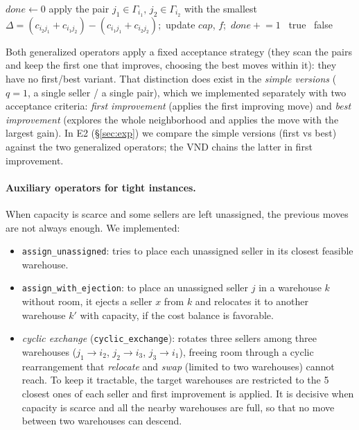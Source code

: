 \documentclass[11pt,a4paper]{article}
\newcommand{\code}[1]{\texttt{#1}}
\begin{document}
\begin{algorithm}[H]
\caption{\emph{Swap multiple} operator (first improvement)}
\begin{algorithmic}[1]
    \State $done \gets 0$
      \State apply the pair $j_1\in\Gamma_{i_1},\,j_2\in\Gamma_{i_2}$ with the smallest $\Delta=(c_{i_2 j_1}+c_{i_1 j_2})-(c_{i_1 j_1}+c_{i_2 j_2})$;\ update $cap$, $f$;\ $done \mathrel{+}= 1$
    \EndWhile
    \ \Return true\ \EndIf
  \EndFor
  \State \Return false
\EndFunction
\end{algorithmic}
\end{algorithm}

Both generalized operators apply a fixed acceptance strategy (they scan the pairs and keep the
first one that improves, choosing the best moves within it): they have no first/best variant. That
distinction does exist in the \emph{simple versions} ($q{=}1$, a single seller / a single pair),
which we implemented separately with two acceptance criteria: \emph{first improvement} (applies the
first improving move) and \emph{best improvement} (explores the whole neighborhood and applies the
move with the largest gain). In E2 (\S\ref{sec:exp}) we compare the simple versions (first vs
best) against the two generalized operators; the VND chains the latter in first improvement.

\paragraph{Auxiliary operators for tight instances.} When capacity is scarce and some sellers are
left unassigned, the previous moves are not always enough. We implemented:
\begin{itemize}
  \item \code{assign\_unassigned}: tries to place each unassigned seller in its closest feasible
        warehouse.
  \item \code{assign\_with\_ejection}: to place an unassigned seller $j$ in a warehouse $k$
        without room, it ejects a seller $x$ from $k$ and relocates it to another warehouse $k'$
        with capacity, if the cost balance is favorable.
  \item \emph{cyclic exchange} (\code{cyclic\_exchange}): rotates three sellers among three
        warehouses ($j_1\to i_2$, $j_2\to i_3$, $j_3\to i_1$), freeing room through a cyclic
        rearrangement that \emph{relocate} and \emph{swap} (limited to two warehouses) cannot
        reach. To keep it tractable, the target warehouses are restricted to the 5 closest ones of
        each seller and first improvement is applied. It is decisive when capacity is scarce and
        all the nearby warehouses are full, so that no move between two warehouses can descend.
\end{itemize}
\end{document}
